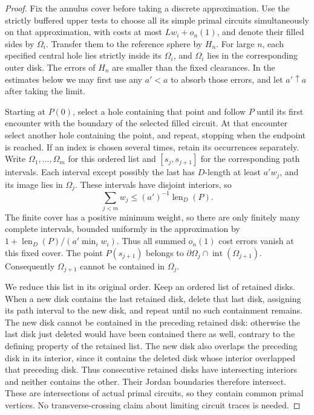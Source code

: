 \begin{proof}
Fix the annulus cover before taking a discrete approximation.  Use the
strictly buffered upper tests to choose all its simple primal circuits
simultaneously on that approximation, with costs at most $Lw_i+o_n(1)$,
and denote their filled sides by
$\Omega_i$.  Transfer them to the reference sphere by $H_n$.  For large
$n$, each specified central hole lies strictly inside its $\Omega_i$,
and $\Omega_i$ lies in the corresponding outer disk.  The errors of
$H_n$ are smaller than the fixed clearances.  In the estimates below we
may first use any $a'<a$ to absorb those errors, and let $a'\uparrow a$
after taking the limit.

Starting at $P(0)$, select a hole containing that point and follow $P$
until its first encounter with the boundary of the selected filled
circuit.  At that encounter select another hole containing the point,
and repeat, stopping when the endpoint is reached.  If an index is
chosen several times, retain its occurrences separately.  Write
$\Omega_1,\ldots,\Omega_m$ for this ordered list and $[s_j,s_{j+1}]$
for the corresponding path intervals.  Each interval except possibly
the last has $D$-length at least $a'w_j$, and its image lies in
$\Omega_j$.  These intervals have disjoint interiors, so
\[
 \sum_{j<m}w_j\le (a')^{-1}\operatorname{len}_D(P).
\]
The finite cover has a positive minimum weight, so there are only
finitely many complete intervals, bounded uniformly in the approximation
by $1+\operatorname{len}_D(P)/(a'\min_iw_i)$.  Thus all summed
$o_n(1)$ cost errors vanish at this fixed cover.  The point $P(s_{j+1})$ belongs to
$\partial\Omega_j\cap\operatorname{int}(\Omega_{j+1})$.  Consequently
$\Omega_{j+1}$ cannot be contained in $\Omega_j$.

We reduce this list in its original order.  Keep an ordered list of
retained disks.  When a new disk contains the last retained disk,
delete that last disk, assigning its path interval to the new disk,
and repeat until no such containment remains.  The new disk cannot
be contained in the preceding retained disk: otherwise the last disk
just deleted would have been contained there as well, contrary to
the defining property of the retained list.  The new disk also overlaps the preceding disk in its interior, since
it contains the deleted disk whose interior overlapped that preceding
disk.
Thus consecutive retained disks have intersecting interiors and
neither contains the other.  Their Jordan boundaries therefore
intersect.  These are intersections of actual primal circuits, so
they contain common primal vertices.  No transverse-crossing claim
about limiting circuit traces is needed.


\end{proof}
